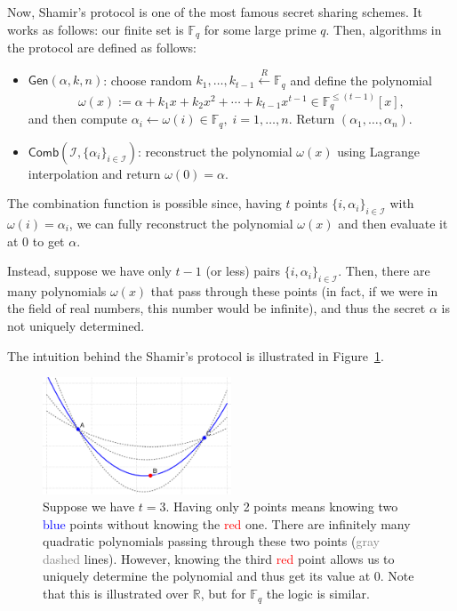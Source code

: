 \documentclass[../lecture-notes.tex]{subfiles}
\begin{document}
Now, Shamir's protocol is one of the most famous secret sharing schemes. It works as follows: our finite set is $\mathbb{F}_q$ for some large prime $q$. Then, algorithms in the protocol are defined as follows:
\begin{itemize}
    \item $\mathsf{Gen}(\alpha, k, n)$: choose random $k_1,\dots,k_{t-1} \xleftarrow[]{R} \mathbb{F}_q$ and define the polynomial
    \begin{equation*}
        \omega(x) := \alpha + k_1x + k_2x^2 + \cdots + k_{t-1}x^{t-1} \in \mathbb{F}_q^{\leq (t-1)}[x],     
    \end{equation*}
    and then compute $\alpha_i \gets \omega(i) \in \mathbb{F}_q, \; i = 1,\dots,n$. Return $(\alpha_1,\dots,\alpha_n)$.
    \item $\mathsf{Comb}(\mathcal{I}, \{\alpha_i\}_{i \in \mathcal{I}})$: reconstruct the polynomial $\omega(x)$ using Lagrange interpolation and return $\omega(0) = \alpha$.
\end{itemize}

The combination function is possible since, having $t$ points $\{i,\alpha_i\}_{i \in \mathcal{I}}$ with $\omega(i) = \alpha_i$, we can fully reconstruct the polynomial $\omega(x)$ and then evaluate it at $0$ to get $\alpha$.

Instead, suppose we have only $t-1$ (or less) pairs $\{i,\alpha_i\}_{i \in \mathcal{I}}$. Then, there are many polynomials $\omega(x)$ that pass through these points (in fact, if we were in the field of real numbers, this number would be infinite), and thus the secret $\alpha$ is not uniquely determined.

The intuition behind the Shamir's protocol is illustrated in Figure~\ref{fig:shamir}.

\begin{figure}[H]
    \centering
    \includegraphics[width=0.5\textwidth]{images/lecture_1/shamir_demo.pdf}
    \caption{Suppose we have $t=3$. Having only 2 points means knowing two \textcolor{blue}{blue} points without knowing the \textcolor{red}{red} one. There are infinitely many quadratic polynomials passing through these two points (\textcolor{gray}{gray dashed} lines). However, knowing the third \textcolor{red}{red} point allows us to uniquely determine the polynomial and thus get its value at $0$. Note that this is illustrated over $\mathbb{R}$, but for $\mathbb{F}_q$ the logic is similar.}
    \label{fig:shamir}
\end{figure}
\end{document}
